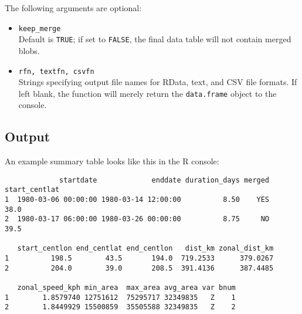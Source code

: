 \documentclass{article}
\begin{document}
The following arguments are optional:
\begin{itemize}
\item[] \texttt{keep\_merge} \\ Default is \texttt{TRUE}; if set to \texttt{FALSE}, the final data table will not contain merged blobs.
\item[] \texttt{rfn, textfn, csvfn}\\Strings specifying output file names for RData, text, and CSV file formats. If left blank, the function will merely return the \texttt{data.frame} object to the console.
\end{itemize}

\subsection{Output}
An example summary table looks like this in the R console:
\begin{verbatim}
             startdate             enddate duration_days merged start_centlat
1  1980-03-06 00:00:00 1980-03-14 12:00:00          8.50    YES          38.0
2  1980-03-17 06:00:00 1980-03-26 00:00:00          8.75     NO          39.5

   start_centlon end_centlat end_centlon   dist_km zonal_dist_km
1          198.5        43.5       194.0  719.2533      379.0267
2          204.0        39.0       208.5  391.4136      387.4485

   zonal_speed_kph min_area  max_area avg_area var bnum
1        1.8579740 12751612  75295717 32349835   Z    1
2        1.8449929 15500859  35505588 32349835   Z    2
\end{verbatim}
\end{document}
